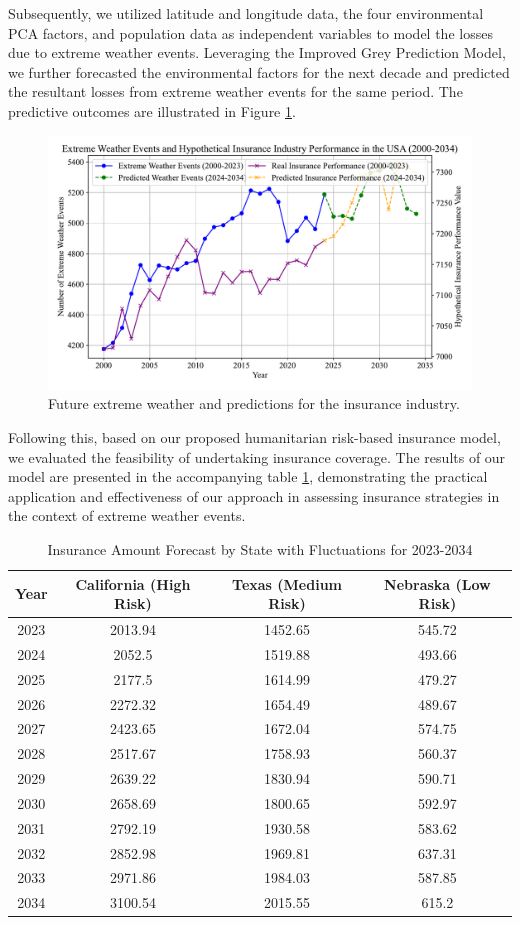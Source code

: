 \documentclass[12pt]{article}
\begin{document}
Subsequently, we utilized latitude and longitude data, the four environmental PCA factors, and population data as independent variables to model the losses due to extreme weather events. Leveraging the Improved Grey Prediction Model, we further forecasted the environmental factors for the next decade and predicted the resultant losses from extreme weather events for the same period. The predictive outcomes are illustrated in Figure \ref{fig:pred}.
\begin{figure}[h]
    \centering
    \includegraphics[width=0.8\linewidth]{figure/weather.pdf}
    \caption{Future extreme weather and predictions for the insurance industry.}
    \label{fig:pred}
\end{figure}

Following this, based on our proposed humanitarian risk-based insurance model, we evaluated the feasibility of undertaking insurance coverage. The results of our model are presented in the accompanying table \ref{tab>pred_with_fluctuations}, demonstrating the practical application and effectiveness of our approach in assessing insurance strategies in the context of extreme weather events.

\begin{table}[htbp]
\centering
\caption{Insurance Amount Forecast by State with Fluctuations for 2023-2034}
\fontsize{8}{9}\selectfont
\begin{tabular}{@{}cccc@{}}
\toprule[1.2pt]
Year & California (High Risk) & Texas (Medium Risk) & Nebraska (Low Risk) \\
\midrule
2023 & 2013.94 & 1452.65 & 545.72 \\
2024 & 2052.5 & 1519.88 & 493.66 \\
2025 & 2177.5 & 1614.99 & 479.27 \\
2026 & 2272.32 & 1654.49 & 489.67 \\
2027 & 2423.65 & 1672.04 & 574.75 \\
2028 & 2517.67 & 1758.93 & 560.37 \\
2029 & 2639.22 & 1830.94 & 590.71 \\
2030 & 2658.69 & 1800.65 & 592.97 \\
2031 & 2792.19 & 1930.58 & 583.62 \\
2032 & 2852.98 & 1969.81 & 637.31 \\
2033 & 2971.86 & 1984.03 & 587.85 \\
2034 & 3100.54 & 2015.55 & 615.2 \\
\bottomrule[1.2pt]
\end{tabular}
\label{tab>pred_with_fluctuations}
\end{table}
\end{document}
